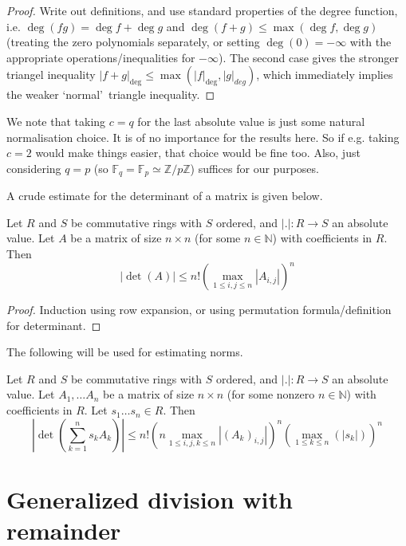 \documentclass{amsart}
\newcommand{\N}{\mathbb{N}}
\newcommand{\Z}{\mathbb{Z}}
\newcommand{\F}{\mathbb{F}}
\begin{document}
\begin{proof}
Write out definitions, and use standard properties of the degree function, i.e. $\deg (fg)=\deg f+\deg g$ and $\deg(f+g)\leq \max(\deg f,\deg g)$ (treating the zero polynomials separately, or setting $\deg(0)=-\infty$ with the appropriate operations/inequalities for $-\infty$). The second case gives the stronger triangel inequality $|f+g|_{\deg} \leq \max(|f|_{\deg},|g|_{deg})$, which  immediately implies the weaker \lq normal\rq\ triangle inequality.
\end{proof}

We note that taking $c=q$ for the last absolute value is just some natural normalisation choice. It is of no importance for the results here. So if e.g. taking $c=2$ would make things easier, that choice would be fine too. Also, just considering $q=p$ (so $\F_q=\F_p \simeq \Z/p\Z$) suffices for our purposes.

A crude estimate for the determinant of a matrix is given below.
\begin{lemma}
Let $R$ and $S$ be commutative rings with $S$ ordered, and $|.|:R \to S$ an absolute value.
Let $A$ be a matrix of size $n \times n$ (for some $n\in \N$) with coefficients in $R$. Then 
\[|\det(A)|\leq n! \left(\max_{1\leq i,j\leq n} |A_{i,j}|\right)^n\]
\end{lemma}

\begin{proof}
Induction using row expansion, or using permutation formula/definition for determinant.
\end{proof}

The following will be used for estimating norms.

\begin{corollary}\label{cor estimate norm}
Let $R$ and $S$ be commutative rings with $S$ ordered, and $|.|:R \to S$ an absolute value.
Let $A_1,\ldots A_n$ be a matrix of size $n \times n$ (for some nonzero $n\in \N$) with coefficients in $R$. Let $s_1\ldots s_n \in R$. Then 
\[ \left|\det(\sum_{k=1}^n s_k A_k) \right| \leq n! \left(n \max_{1\leq i,j,k\leq n} |(A_k)_{i,j}|\right)^n \left( \max_{1\leq k\leq n}(|s_k|) \right)^n\]
\end{corollary}

\section{Generalized division with remainder}
\end{document}
